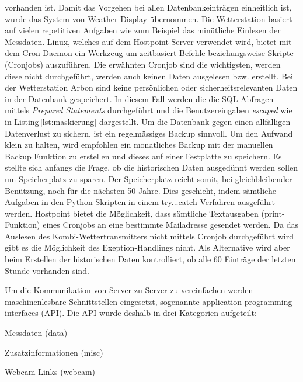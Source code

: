 \documentclass[11pt]{article}
\begin{document}
\begin{multicols}{2}
vorhanden ist. Damit das Vorgehen bei allen Datenbankeinträgen einheitlich ist, wurde das System von Weather Display übernommen. Die Wetterstation basiert auf vielen repetitiven Aufgaben wie zum Beispiel das minütliche Einlesen der Messdaten. Linux, welches auf dem Hostpoint-Server verwendet wird, bietet mit dem Cron-Daemon ein Werkzeug um zeitbasiert Befehle beziehungsweise Skripte (Cronjobs) auszuführen. Die erwähnten Cronjob sind die wichtigsten, werden diese nicht durchgeführt, werden auch keinen Daten ausgelesen bzw. erstellt. Bei der Wetterstation Arbon sind keine persönlichen oder sicherheitsrelevanten Daten in der Datenbank gespeichert. In diesem Fall werden die
die SQL-Abfragen mittels \emph{Prepared Statements} durchgeführt und die Benutzereingaben \emph{escaped} wie in Listing\,\ref{lst:maskierung} dargestellt. Um die Datenbank gegen einen allfälligen Datenverlust zu sichern, ist ein regelmässiges Backup sinnvoll. Um den Aufwand klein zu halten, wird empfohlen ein monatliches Backup mit der manuellen Backup Funktion zu erstellen und dieses auf einer Festplatte zu speichern.  Es stellte sich anfangs die Frage, ob die historischen Daten ausgedünnt werden sollen um Speicherplatz zu sparen. Der Speicherplatz reicht somit, bei gleichbleibender Benützung, noch für die nächsten 50 Jahre.  Dies geschieht, indem sämtliche Aufgaben in den Python-Skripten in einem try...catch-Verfahren ausgeführt werden.  Hostpoint bietet die Möglichkeit, dass sämtliche Textausgaben (print-Funktion) eines Cronjobs an eine bestimmte Mailadresse gesendet werden. Da das Auslesen des Kombi-Wettertransmitters nicht mittels Cronjob durchgeführt wird gibt es die Möglichkeit des Exeption-Handlings nicht. Als Alternative wird aber beim Erstellen der historischen Daten kontrolliert, ob alle 60 Einträge der letzten Stunde vorhanden sind.



Um die Kommunikation von Server zu Server zu vereinfachen werden maschinenlesbare Schnittstellen eingesetzt, sogenannte application programming interfaces (API). Die API wurde deshalb in drei Kategorien aufgeteilt:

\begin{itemize*}
\item Messdaten (data)
\item Zusatzinformationen (misc)
\item Webcam-Links (webcam)
\end{itemize*}


\end{multicols}
\end{document}
